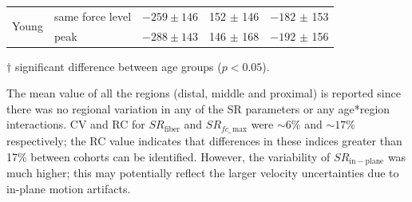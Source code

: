 \begin{table}[!htb]
\begin{center}
\begin{threeparttable}
\begin{tabular}{@{}llrrr@{}}
\multicolumn{1}{l}{\multirow{2}{*}{Young}}                      & same force level & $-259 \pm 146$  & 152 $\pm$ 146    & $-182$ $\pm$ 153  	\\
      	                                    & peak             & $-288 \pm 143$\tnote{$\dagger$} & 146 $\pm$ 168    & $-192$ $\pm$ 156  	\\ \midrule[0.3pt]\bottomrule[1pt]
\end{tabular}
\begin{tablenotes}[flushleft]\footnotesize
\item[$\dagger$] significant difference between age groups ($p<0.05$).
\end{tablenotes}
\end{threeparttable}
\end{center}
\vspace{-0.2cm}
\end{table}
The mean value of all the regions (distal, middle and proximal) is reported since there was no regional variation in any of the SR parameters or any age*region interactions. 
CV and RC for $SR_{\mathrm{fiber}}$ and $SR_{fc\_\,\mathrm{max}}$ were $\sim 6\%$ and $\sim 17\%$ respectively; the RC value indicates that differences in these indices greater than 17\% between cohorts can be identified. 
However, the variability of $SR_{\mathrm{in-plane}}$ was much higher; this may potentially reflect the larger velocity uncertainties due to in-plane motion artifacts. 

